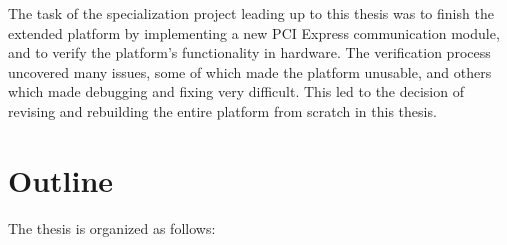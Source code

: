 The task of the specialization project leading up to this thesis was to finish the extended platform by implementing a new PCI Express communication module, and to verify the platform's functionality in hardware.
The verification process uncovered many issues, some of which made the platform unusable, and others which made debugging and fixing very difficult.
This led to the decision of revising and rebuilding the entire platform from scratch in this thesis.


\section{Outline}

The thesis is organized as follows:

